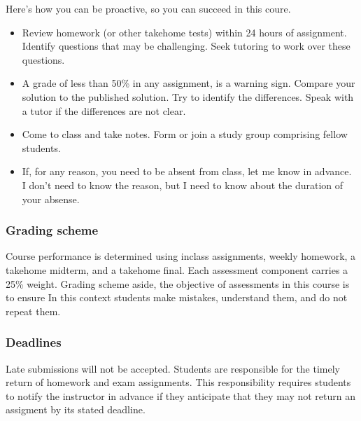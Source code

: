 \documentclass[letterpaper,10pt,english]{sphinxmanual}
\begin{document}
Here’s how you can be proactive, so you can succeed in this coure.
\begin{itemize}
\item {} 
Review homework (or other take\sphinxhyphen{}home tests) within 24 hours of assignment. Identify questions that may be challenging. Seek tutoring to work over these questions. 

\item {} 
A grade of less than 50\% in any assignment, is a warning sign. Compare your solution to the published solution. Try to identify the differences. Speak with a tutor if the differences are not clear.

\item {} 
Come to class and take notes. Form or join a study group comprising fellow students.

\item {} 
If, for any reason, you need to be absent from class, let me know in advance. I don’t need to know the reason, but I need to know about the duration of your absense.

\end{itemize}


\subsubsection{Grading scheme}
\label{\detokenize{COMP170/organization:grading-scheme}}
Course performance is determined using in\sphinxhyphen{}class assignments, weekly homework, a take\sphinxhyphen{}home midterm, and a take\sphinxhyphen{}home final. Each assessment component carries a 25\% weight. Grading scheme aside, the objective of assessments in this course is to ensure  In this context students make mistakes, understand them, and do not repeat them.


\subsubsection{Deadlines}
\label{\detokenize{COMP170/organization:deadlines}}
Late submissions will not be accepted. Students are responsible for the timely return of homework and exam assignments. This responsibility requires students to notify the instructor in advance if they anticipate that they may not return an assigment by its stated deadline.
\end{document}
